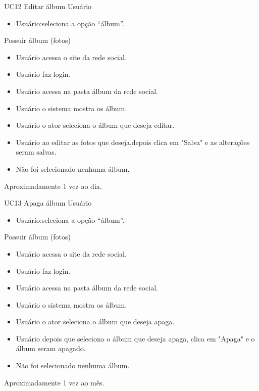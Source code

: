 
\casoDeUso
{UC12}
{Editar álbum}
{Usuário}
{
\begin{itemize}
	\item Usuário:seleciona a opção “álbum”.
	
\end{itemize}

}
 {Possuir álbum (fotos)}
{}
{
\begin{itemize}
	\item Usuário acessa o site da rede social.
	\item Usuário faz login.
	\item Usuário acessa na pasta álbum da rede social.
	\item Usuário o sistema mostra os álbum.
	\item Usuário o ator seleciona o álbum que deseja editar.
	\item Usuário ao editar as fotos que deseja,depois clica em "Salva" e as alterações seram salvas.
\end{itemize}
}
{
\begin{itemize}
	\item Não foi selecionado nenhuma álbum.

\end{itemize}
}
{Aproximadamente 1 vez ao dia.}
{

}


\casoDeUso
{UC13}
{Apaga álbum}
{Usuário}
{
\begin{itemize}
	\item Usuário:seleciona a opção “álbum”.
	
\end{itemize}

}
 {Possuir álbum (fotos)}
{}
{
\begin{itemize}
	\item Usuário acessa o site da rede social.
	\item Usuário faz login.
	\item Usuário acessa na pasta álbum da rede social.
	\item Usuário o sistema mostra os álbum.
	\item Usuário o ator seleciona o álbum que deseja apaga.
	\item Usuário depois que seleciona o álbum que deseja apaga, clica em "Apaga" e o álbum seram apagado.
\end{itemize}
}
{
\begin{itemize}
	\item Não foi selecionado nenhuma álbum.

\end{itemize}
}
{Aproximadamente 1 vez ao mês.}
{

}


